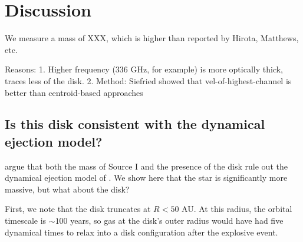 \documentclass[twocolumn]{aastex61}
\begin{document}
\section{Discussion}
We measure a mass of XXX, which is higher than reported by Hirota, Matthews, etc.

Reasons:
1. Higher frequency (336 GHz, for example) is more optically thick, traces less
of the disk.
2. Method: Siefried showed that vel-of-highest-channel is better than centroid-based
approaches

\subsection{Is this disk consistent with the dynamical ejection model?}
\citet{Plambeck2016a} argue that both the mass of Source I and the presence of the disk
rule out the dynamical ejection model of \citet{Bally2011a}.  We show here that
the star is significantly more massive, but what about the disk?

First, we note that the disk truncates at $R<50$ AU.  At this radius, the
orbital timescale is $\sim100$ years, so gas at the disk's outer radius would
have had five dynamical times to relax into a disk configuration after the
explosive event.


\end{document}
